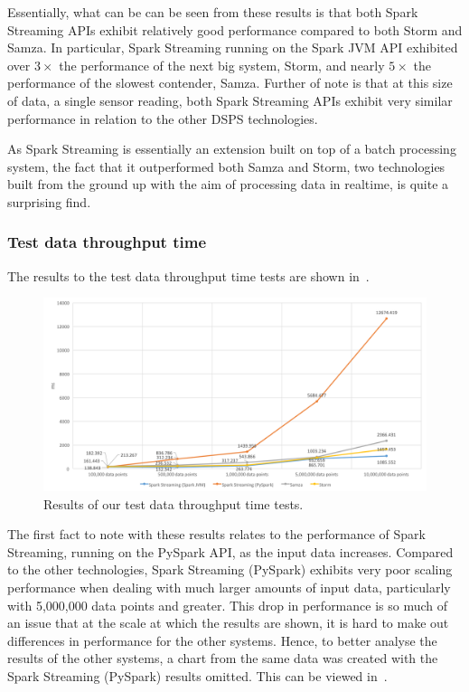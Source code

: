Essentially, what can be can be seen from these results is that both Spark Streaming APIs exhibit relatively good performance
compared to both Storm and Samza. In particular, Spark Streaming running on the Spark JVM API exhibited over $3\times$ the
performance of the next big system, Storm, and nearly $5\times$ the performance of the slowest contender, Samza. Further of
note is that at this size of data, a single sensor reading, both Spark Streaming APIs exhibit very similar performance
in relation to the other DSPS technologies.

As Spark Streaming is essentially an extension built on top of a batch processing system, the fact that it outperformed
both Samza and Storm, two technologies built from the ground up with the aim of processing data in realtime, is quite a
surprising find.

\subsubsection{Test data throughput time}

The results to the test data throughput time tests are shown in~.

\begin{figure}[H]
  \centering
  \includegraphics[width=1\textwidth]{includes/figures/fig_throughput_res}
  \caption{Results of our test data throughput time tests.}
  \label{fig:throughput_time_res}
\end{figure}

The first fact to note with these results relates to the performance of Spark Streaming, running on the PySpark API, as the
input data increases. Compared to the other technologies, Spark Streaming (PySpark) exhibits very poor scaling performance
when dealing with much larger amounts of input data, particularly with 5,\@000,\@000 data points and greater. This drop in
performance is so much of an issue that at the scale at which the results are shown, it is hard to make out differences in
performance for the other systems. Hence, to better analyse the results of the other systems, a chart from the same
data was created with the Spark Streaming (PySpark) results omitted. This can be viewed in~.

